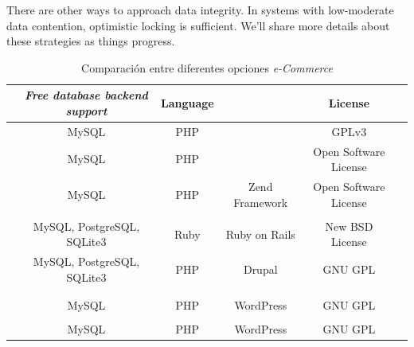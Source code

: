 There are other ways to approach data integrity. In systems with low-moderate data contention, optimistic locking is sufficient. We’ll share more details about these strategies as things progress.



\begin{table}[h!]
    \tiny
   
\begin{tabular}{ |l|c|c|c|c|c| }


\hline
	&
	\textit{Free database backend support}&
	Language&
	\textit{\gloss{waf}}&
	License&

\\ \hline
	\nameOpenCart &
	MySQL&
	PHP&
	&
	GPLv3&
	
\\ \hline
	\namePrestaShop &
	MySQL&
	PHP&
	&
	Open Software License&
	
\\ \hline
	\nameMagento &
	MySQL&
	PHP&
	Zend Framework\cite{online_zend_framework}&
	Open Software License&
	
\\ \hline
	\nameZenCart &
	&
	&
	&
	&
 
\\ \hline
	\nameSpreeCommerce &
	MySQL, PostgreSQL, SQLite3&
	Ruby\cite{online_ruby_language}&
	Ruby on Rails\cite{online_ruby_rails}&
	New BSD License&

\\ \hline
	\nameDrupalCommerce &
	MySQL, PostgreSQL, SQLite3&
	PHP&
	Drupal\cite{online_drupal}&
	GNU GPL&
	
\\ \hline
	\nameOsCommerce &
	&
	&
	&
	&

\\ \hline
	\nameSimpleCart &
	&
	&
	&
	&
	
\\ \hline
	\nameWooCommerce &
	MySQL&
	PHP&
	WordPress\cite{online_wordpress}&
	GNU GPL&
	
\\ \hline
	\nameWPECommerce &
	&
	&
	&
	&
	
\\ \hline
	\nameJigoshop &
	MySQL&
	PHP&
	WordPress\cite{online_wordpress}&
	GNU GPL&
	
\\ \hline
\end{tabular}
    \caption{ Comparación entre diferentes opciones \textit{e-Commerce}}
    \label{tab:wide_table}
\end{table}


